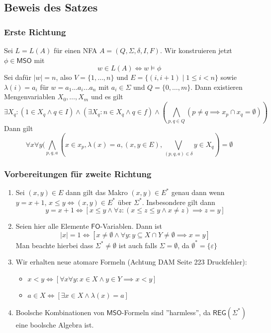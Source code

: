\documentclass[12pt, german]{article}
\newcommand{\sigstern}{\Sigma^\ast}
\newcommand{\east}{E^{\ast}}
\newcommand{\fo}{\mathsf{FO}}
\newcommand{\mso}{\mathsf{MSO}}
\newcommand{\reg}{\mathsf{REG}}
\begin{document}
\subsection{Beweis des Satzes}
\subsubsection{Erste Richtung}
	Sei $L= L(A)$ für einen NFA $A= (Q, \Sigma, \delta, I, F)$. Wir konstruieren jetzt $\phi \in \mso$ mit $$w \in L(A) \iff w \models \phi$$
	Sei dafür $|w| = n$, also $V = \{1, \ldots, n\}$ und $E=\{(i, i+1) \mid 1 \leq i <n\}$ sowie $\lambda(i) = a_i$ für $w = a_1 \ldots a_i \ldots a_n$ mit $a_i \in \Sigma$ und $Q = \{0, \ldots, m\}$. Dann existieren Mengenvariablen $X_0, \ldots, X_m$ und es gilt 
	$$\exists X_q : (1 \in X_q \land q \in I) \land (\exists X_q : n \in X_q \land q \in f) \land  (\bigwedge_{p, q \in Q} (p \not = q \implies x_p \cap x_q = \emptyset))$$
	Dann gilt $$ \forall x \forall y ( \bigwedge_{p, q, a} (x \in x_p, \lambda(x)= a, (x,y \in E),  \bigvee_{(p,q,a) \in \delta} y \in X_q) = \emptyset$$

\subsubsection{Vorbereitungen für zweite Richtung}
	\begin{enumerate}[label= \arabic*.)]
		\item Sei $(x,y) \in E$ dann gilt das Makro $(x,y) \in \east$ genau dann wenn $y = x +1$, $x \leq y \iff (x, y) \in \east$ über $\sigstern$. Insbesondere gilt dann 
				$$ y = x +1 \iff [x \leq y \land \forall z : (x \leq z \leq y \land x \not = z) \implies z = y]$$
		\item Seien hier alle Elemente $\fo$-Variablen. Dann ist $$|x| = 1 \iff [x \not =\emptyset \land \forall y : y \subseteq X \cap Y \not = \emptyset \implies x = y]$$
				Man beachte hierbei dass $\sigstern \not = \emptyset$  ist auch falls $ \Sigma = \emptyset$, da $\emptyset^\ast = \{\varepsilon\}$
		\item Wir erhalten neue atomare Formeln (Achtung DAM Seite 223 Druckfehler): 
			\begin{itemize}
				\item $x < y \iff [\forall x \forall y : x \in X \land y \in Y \implies x < y]$
				\item $a\in X \iff [\exists x \in X \land \lambda(x)=a] $
			\end{itemize}
		\item Boolsche Kombinationen von $\mso$-Formeln sind ''harmless'', da $\reg(\sigstern)$ eine boolsche Algebra ist.
	\end{enumerate}
\end{document}
